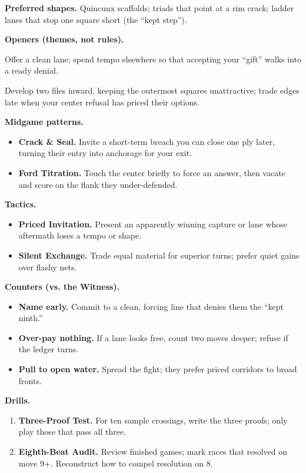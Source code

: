 \documentclass[11pt]{article}
\numberwithin{equation}{section} %
\theoremstyle{plain} %
\theoremstyle{definition} %
\theoremstyle{remark} %
\begin{document}
\medskip
\noindent\textbf{Preferred shapes.} Quincunx scaffolds; triads that point at a rim crack; ladder lanes that stop one square short (the “kept step”).

\medskip
\noindent\textbf{Openers (themes, not rules).}
\begin{description}\setlength\itemsep{0.35em}
  \item[\textit{Copper Ledger.}] Offer a clean lane; spend tempo elsewhere so that accepting your “gift” walks into a ready denial.
  \item[\textit{Salt Ring.}] Develop two files inward, keeping the outermost squares unattractive; trade edges late when your center refusal has priced their options.
\end{description}

\medskip
\noindent\textbf{Midgame patterns.}
\begin{itemize}\setlength\itemsep{0.25em}
  \item \textbf{Crack \& Seal.} Invite a short-term breach you can close one ply later, turning their entry into anchorage for your exit.
  \item \textbf{Ford Titration.} Touch the center briefly to force an answer, then vacate and score on the flank they under-defended.
\end{itemize}

\medskip
\noindent\textbf{Tactics.}
\begin{itemize}\setlength\itemsep{0.25em}
  \item \textbf{Priced Invitation.} Present an apparently winning capture or lane whose aftermath loses a tempo or shape.
  \item \textbf{Silent Exchange.} Trade equal material for superior turns; prefer quiet gains over flashy nets.
\end{itemize}

\medskip
\noindent\textbf{Counters (vs. the Witness).}
\begin{itemize}\setlength\itemsep{0.25em}
  \item \textbf{Name early.} Commit to a clean, forcing line that denies them the “kept ninth.”
  \item \textbf{Over-pay nothing.} If a lane looks free, count two moves deeper; refuse if the ledger turns.
  \item \textbf{Pull to open water.} Spread the fight; they prefer priced corridors to broad fronts.
\end{itemize}

\medskip
\noindent\textbf{Drills.}
\begin{enumerate}\setlength\itemsep{0.25em}
  \item \textbf{Three-Proof Test.} For ten sample crossings, write the three proofs; only play those that pass all three.
  \item \textbf{Eighth-Beat Audit.} Review finished games; mark races that resolved on move 9+. Reconstruct how to compel resolution on 8.
\end{enumerate}
\end{document}
